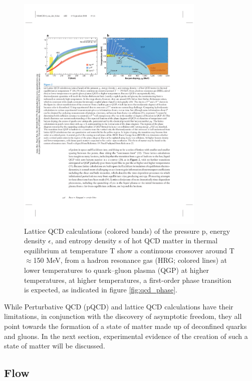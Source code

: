 \begin{figure}[htpb]
  \centering
  \includegraphics[width=0.8\textwidth]{Introduction/lattice_qcd.pdf}
  \caption{Lattice QCD calculations (colored bands) of the pressure p, energy density $\epsilon$, and entropy density s of hot QCD matter in thermal equilibrium at temperature T \cite{Borsanyi2014,HotQCDCollaboration2014} show a continuous crossover around T$\approx$150 MeV, from a hadron resonance gas (HRG; colored lines) at lower temperatures to quark–gluon plasma (QGP) at higher temperatures, at higher temperatures, a first-order phase transition is expected, as indicated in figure \ref{fig:qcd_phase}\cite{annurev-nucl}.}
  \label{fig:lattice_qcd}
\end{figure}


While Perturbative QCD (pQCD) and lattice QCD calculations have their limitations, in conjunction with the discovery of asymptotic freedom, they all point towards the formation of a state of matter made up of deconfined quarks and gluons. In the next section, experimental evidence of the creation of such a state of matter will be discussed. 

\subsection{Flow}\label{sec:flow}

